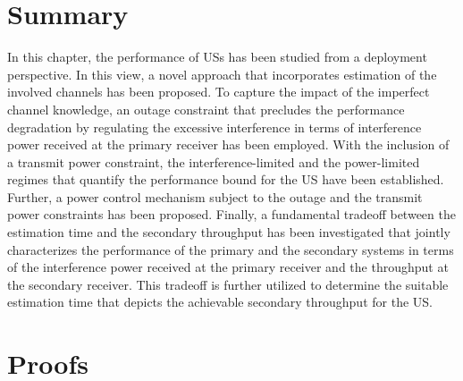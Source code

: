 {\section{Summary} \label{sec:conc}
In this chapter, the performance of USs has been studied from a deployment perspective. In this view, a novel approach that incorporates estimation of the involved channels has been proposed. To capture the impact of the imperfect channel knowledge, an outage constraint that precludes the performance degradation by regulating the excessive interference in terms of interference power received at the primary receiver has been employed. With the inclusion of a transmit power constraint, the interference-limited and the power-limited regimes that quantify the performance bound for the US have been established. Further, a power control mechanism subject to the outage and the transmit power constraints has been proposed. Finally, a fundamental tradeoff between the estimation time and the secondary throughput has been investigated that jointly characterizes the performance of the primary and the secondary systems in terms of the interference power received at the primary receiver and the throughput at the secondary receiver. This tradeoff is further utilized to determine the suitable estimation time that depicts the achievable secondary throughput for the US. %

\section{Proofs}
}
